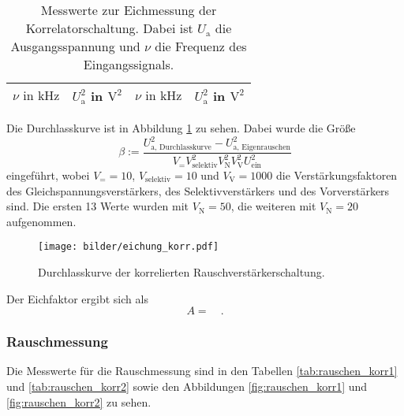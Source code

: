 		\begin{table}[h]
		\centering
			\begin{tabular}{cccc}
				\toprule \midrule
				$\nu \text{ in} \text{ kHz}$ & $U^2_\text{a}$ in $\text{V}^2$ &
				$\nu \text{ in} \text{ kHz}$ & $U^2_\text{a}$ in $\text{V}^2$ 
				\\
				\midrule
				
				\midrule \bottomrule
			\end{tabular}
			\caption{Messwerte zur Eichmessung der Korrelatorschaltung. Dabei ist $U_\text{a}$ 
			die 
			Ausgangsspannung und $\nu$ die Frequenz des 
			Eingangssignals. }
			\label{tab:eichung_korr}
		\end{table}
		
		Die Durchlasskurve ist in Abbildung \ref{fig:eichung_korr} zu sehen. Dabei wurde die Größe  
		\begin{equation}
		\beta := \frac{U^2_\text{a, Durchlasskurve}-U_\text{a, Eigenrauschen}^2}
		{V_= V_\text{selektiv}^2 V_\text{N}^2 V_\text{V}^2  U^2_\text{ein}}
		\end{equation}
		eingeführt, wobei $V_= =10$, $V_\text{selektiv}=10$ und $V_\text{V}=1000$
		die Verstärkungsfaktoren des Gleichspannungsverstärkers, des Selektivverstärkers und des 
		Vorverstärkers sind. Die ersten 13 Werte wurden mit $V_\text{N}=50$, die weiteren 
		mit $V_\text{N}=20$ aufgenommen.
				
		\begin{figure}
			\centering
			\texttt{[image: bilder/eichung\_korr.pdf]}
			\caption{Durchlasskurve der korrelierten Rauschverstärkerschaltung.}
			\label{fig:eichung_korr}
		\end{figure}
		
		Der Eichfaktor ergibt sich als
		\begin{equation}
			A =    \quad .  
		\end{equation}


	\clearpage
	\subsubsection{Rauschmessung}
		Die Messwerte für die Rauschmessung sind in den Tabellen \ref{tab:rauschen_korr1} 
		und \ref{tab:rauschen_korr2} sowie den Abbildungen 
		\ref{fig:rauschen_korr1} und \ref{fig:rauschen_korr2} zu sehen.
		

